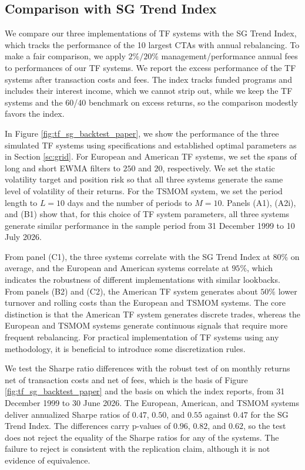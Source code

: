 \documentclass[hidelinks]{siamonline250211}
\begin{document}
\subsection{Comparison with SG Trend Index}\label{sec:comp}

We compare our three implementations of TF systems with the SG Trend Index, which tracks the performance of the 10 largest CTAs with annual rebalancing. To make a fair comparison, we apply $2\%/20\%$ management/performance annual fees to performances of our TF systems. We report the excess performance of the TF systems after transaction costs and fees. The index tracks funded programs and includes their interest income, which we cannot strip out, while we keep the TF systems and the 60/40 benchmark on excess returns, so the comparison modestly favors the index.


In Figure \ref{fig:tf_sg_backtest_paper}, we show the performance of the three simulated TF systems using specifications and established optimal parameters as in Section \ref{sc:grid}. For European and American TF systems, we set the spans of long and short EWMA filters to $250$ and $20$, respectively. We set the static volatility target and position risk so that all three systems generate the same level of volatility of their returns. For the TSMOM system, we set the period length to $L=10$ days and the number of periods to $M=10$. Panels (A1), (A2i), and (B1) show that, for this choice of TF system parameters, all three systems generate similar performance in the sample period from 31 December 1999 to 10 July 2026. 

From panel (C1), the three systems correlate with the SG Trend Index at $80\%$ on average, and the European and American systems correlate at $95\%$, which indicates the robustness of different implementations with similar lookbacks. From panels (B2) and (C2), the American TF system generates about $50\%$ lower turnover and rolling costs than the European and TSMOM systems. The core distinction is that the American TF system generates discrete trades, whereas the European and TSMOM systems generate continuous signals that require more frequent rebalancing. For practical implementation of TF systems using any methodology, it is beneficial to introduce some discretization rules.

We test the Sharpe ratio differences with the robust test of \cite{LedoitWolf2008} on monthly returns net of transaction costs and net of fees, which is the basis of Figure \ref{fig:tf_sg_backtest_paper} and the basis on which the index reports, from 31 December 1999 to 30 June 2026. The European, American, and TSMOM systems deliver annualized Sharpe ratios of $0.47$, $0.50$, and $0.55$ against $0.47$ for the SG Trend Index. The differences carry p-values of $0.96$, $0.82$, and $0.62$, so the test does not reject the equality of the Sharpe ratios for any of the systems. The failure to reject is consistent with the replication claim, although it is not evidence of equivalence.
\end{document}
